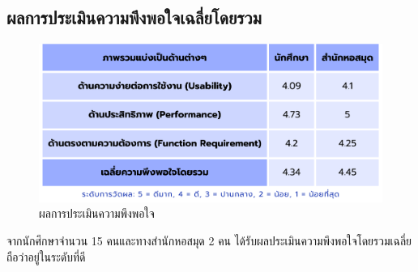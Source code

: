\subsection{ผลการประเมินความพึงพอใจเฉลี่ยโดยรวม}
\begin{figure}[ht]
    \centering
    \includegraphics[scale=0.4]{images/satisfaction.png}
    \caption[satisfaction]{ผลการประเมินความพึงพอใจ}
    \label{fig:satisfaction}
\end{figure}
จากนักศึกษาจำนวน 15 คนและทางสำนักหอสมุด 2 คน ได้รับผลประเมินความพึงพอใจโดยรวมเฉลี่ยถือว่าอยู่ในระดับที่ดี


